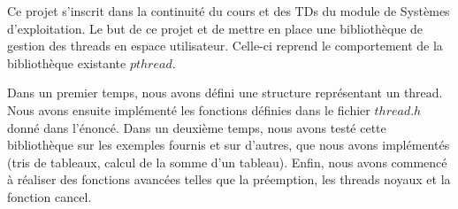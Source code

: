 Ce projet s'inscrit dans la continuité du cours et des TDs du module de Systèmes d'exploitation. Le but de ce projet et de mettre en place une bibliothèque de gestion des threads en espace utilisateur. Celle-ci reprend le comportement de la bibliothèque existante $pthread$. 

Dans un premier temps, nous avons défini une structure représentant un thread. Nous avons ensuite implémenté les fonctions définies dans le fichier $thread.h$ donné dans l'énoncé. Dans un deuxième temps, nous avons testé cette bibliothèque sur les exemples fournis et sur d'autres, que nous avons implémentés (tris de tableaux, calcul de la somme d'un tableau). Enfin, nous avons commencé à réaliser des fonctions avancées telles que la préemption, les threads noyaux et la fonction cancel. 

